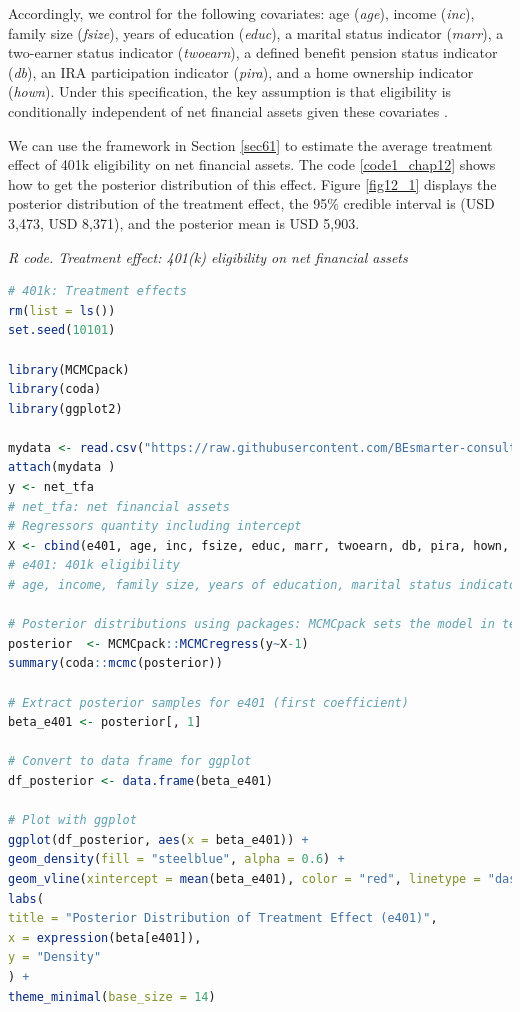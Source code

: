 Accordingly, we control for the following covariates: age (\textit{age}), income (\textit{inc}), family size (\textit{fsize}), years of education (\textit{educ}), a marital status indicator (\textit{marr}), a two-earner status indicator (\textit{twoearn}), a defined benefit pension status indicator (\textit{db}), an IRA participation indicator (\textit{pira}), and a home ownership indicator (\textit{hown}). Under this specification, the key assumption is that eligibility is conditionally independent of net financial assets given these covariates \cite{chernozhukov2024applied}.

We can use the framework in Section \ref{sec61} to estimate the average treatment effect of 401k eligibility on net financial assets. The code \ref{code1_chap12} shows how to get the posterior distribution of this effect. Figure \ref{fig12_1} displays the posterior distribution of the treatment effect, the 95\% credible interval is (USD 3,473, USD 8,371), and the posterior mean is USD 5,903.

\begin{tcolorbox}[enhanced,width=4.67in,center upper,
	fontupper=\large\bfseries,drop shadow southwest,sharp corners]\label{code1_chap12}
	\textit{R code. Treatment effect: 401(k) eligibility on net financial assets}
	\begin{VF}
		\begin{lstlisting}[language=R]		
# 401k: Treatment effects
rm(list = ls())
set.seed(10101)

library(MCMCpack)
library(coda)
library(ggplot2)

mydata <- read.csv("https://raw.githubusercontent.com/BEsmarter-consultancy/BSTApp/refs/heads/master/DataApp/401k.csv", sep = ",", header = TRUE, quote = "")
attach(mydata )
y <- net_tfa 
# net_tfa: net financial assets
# Regressors quantity including intercept
X <- cbind(e401, age, inc, fsize, educ, marr, twoearn, db, pira, hown, 1)
# e401: 401k eligibility 
# age, income, family size, years of education, marital status indicator, two-earner status indicator, defined benefit pension status indicator, IRA participation indicator, and home ownership indicator.

# Posterior distributions using packages: MCMCpack sets the model in terms of the precision matrix. We use default parameters
posterior  <- MCMCpack::MCMCregress(y~X-1)
summary(coda::mcmc(posterior))

# Extract posterior samples for e401 (first coefficient)
beta_e401 <- posterior[, 1]

# Convert to data frame for ggplot
df_posterior <- data.frame(beta_e401)

# Plot with ggplot
ggplot(df_posterior, aes(x = beta_e401)) +
geom_density(fill = "steelblue", alpha = 0.6) +
geom_vline(xintercept = mean(beta_e401), color = "red", linetype = "dashed") +
labs(
title = "Posterior Distribution of Treatment Effect (e401)",
x = expression(beta[e401]),
y = "Density"
) +
theme_minimal(base_size = 14)
\end{lstlisting}
	\end{VF}
\end{tcolorbox}  

